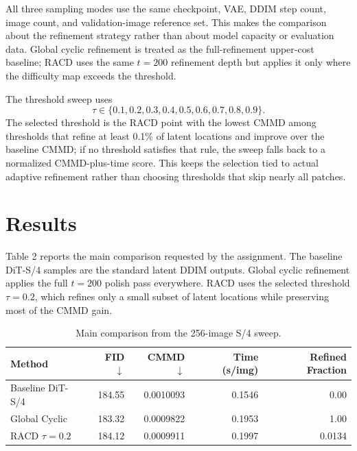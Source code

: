\documentclass{article}
\begin{document}
All three sampling modes use the same checkpoint, VAE, DDIM step count, image
count, and validation-image reference set. This makes the comparison about the
refinement strategy rather than about model capacity or evaluation data. Global
cyclic refinement is treated as the full-refinement upper-cost baseline; RACD
uses the same $t=200$ refinement depth but applies it only where the difficulty
map exceeds the threshold.

The threshold sweep uses
\[
  \tau \in \{0.1, 0.2, 0.3, 0.4, 0.5, 0.6, 0.7, 0.8, 0.9\}.
\]
The selected threshold is the RACD point with the lowest CMMD among thresholds
that refine at least 0.1\% of latent locations and improve over the baseline
CMMD; if no threshold satisfies that rule, the sweep falls back to a normalized
CMMD-plus-time score. This keeps the selection tied to actual adaptive
refinement rather than choosing thresholds that skip nearly all patches.

\section{Results}

Table 2 reports the main comparison requested by the assignment. The baseline
DiT-S/4 samples are the standard latent DDIM outputs. Global cyclic refinement
applies the full $t=200$ polish pass everywhere. RACD uses the selected
threshold $\tau=0.2$, which refines only a small subset of latent locations
while preserving most of the CMMD gain.

\begin{table}[H]
\centering
\begin{tabular}{lrrrr}
\toprule
Method & FID $\downarrow$ & CMMD $\downarrow$ & Time (s/img) & Refined Fraction \\
\midrule
Baseline DiT-S/4 & 184.55 & 0.0010093 & 0.1546 & 0.00 \\
Global Cyclic & 183.32 & 0.0009822 & 0.1953 & 1.00 \\
RACD $\tau=0.2$ & 184.12 & 0.0009911 & 0.1997 & 0.0134 \\
\bottomrule
\end{tabular}
\caption{Main comparison from the 256-image S/4 sweep.}
\end{table}
\end{document}
